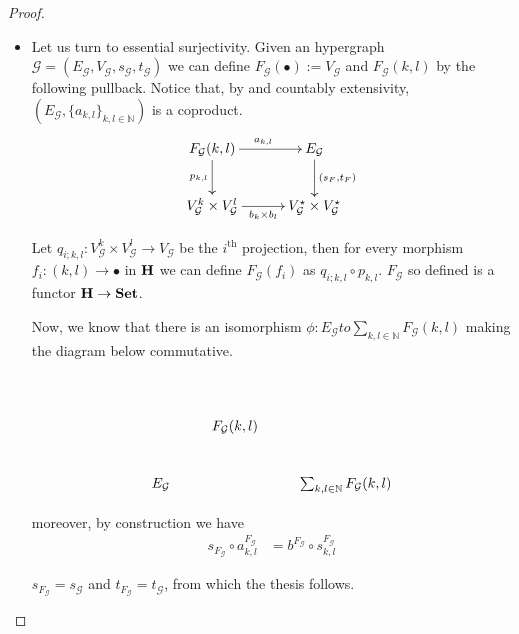\documentclass[runningheads,envcountsect]{llncs}
\def\E{\textbf {\textup{E}}}
\newcommand{\catname}[1]{\textbf{\textup{#1}}}
\begin{document}
\begin{proof}
\begin{itemize}
		\item  Let us turn to essential surjectivity. Given an hypergraph $\mathcal{G}=(E_\mathcal{G}, V_\mathcal{G}, s_\mathcal{G}, t_\mathcal{G})$ we can define $F_{\mathcal{G}}(\bullet):=V_{\mathcal{G}}$ and $F_{\mathcal{G}}(k,l)$ by the following pullback. Notice that, by  and countably extensivity, $(E_{\mathcal{{G}}}, \{a_{k,l}\}_{k,l\in \mathbb{N}})$ is a coproduct.
		\[\xymatrix@C=30pt{F_\mathcal{G}(k,l) \ar[d]_{p_{k,l}}  \ar[r]^{a_{k,l}}& E_{\mathcal{G}} \ar[d]^{(s_F, t_F)} \\ V_{\mathcal{G}}^k\times V_{\mathcal{G}}^l \ar[r]_{b_k\times b_l} & V_{\mathcal{G}}^\star\times V_{\mathcal{G}}^\star}\]
		
		Let $q_{i;k,l}\colon V_\mathcal{G}^k\times V_{\mathcal{G}}^l\to V_\mathcal{G} $ be the $i^{\text{th}}$ projection, then for every morphism $f_i\colon (k,l)\to \bullet$ in $\catname{H}$ we can define $F_{\mathcal{G}}(f_i)$ as $q_{i; k,l}\circ p_{k,l}$. $F_{\mathcal{G}}$ so defined is a functor $\catname{H}\to \catname{Set}$. 
		
		Now, we know that there is an isomorphism $\phi \colon E_{\mathcal{G}} to \sum_{k,l\in \mathbb{N}} F_{\mathcal{G}}(k,l)$ making the diagram below commutative.
		\[\xymatrix{\\& F_{\mathcal{G}}(k,l) \\E_{\mathcal{G}} & & \sum_{k,l\in \mathbb{N}} F_{\mathcal{G}}(k,l)}\]
		
		 moreover, by construction we have
		\[\begin{split}
		s_{F_{\mathcal{G}}}\circ a^{F_{\mathcal{G}}}_{k,l}&=b^{F_{\mathcal{G}}}\circ s^{F_{\mathcal{G}}}_{k,l}
		\end{split}\]
		
		
		
		$s_{F_{\mathcal{G}}}=s_{\mathcal{G}}$ and $t_{F_{\mathcal{G}}}=t_{\mathcal{G}}$, from which the thesis follows. 
	\end{itemize}
\end{proof}
\end{document}
